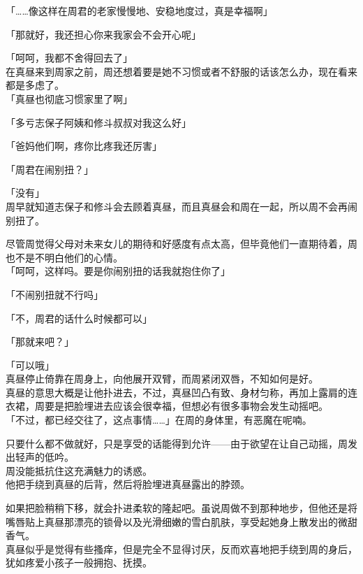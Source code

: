 「……像这样在周君的老家慢慢地、安稳地度过，真是幸福啊」

「那就好，我还担心你来我家会不会开心呢」

「呵呵，我都不舍得回去了」\\

在真昼来到周家之前，周还想着要是她不习惯或者不舒服的话该怎么办，现在看来都是多虑了。\\

「真昼也彻底习惯家里了啊」

「多亏志保子阿姨和修斗叔叔对我这么好」

「爸妈他们啊，疼你比疼我还厉害」

「周君在闹别扭？」

「没有」\\

周早就知道志保子和修斗会去顾着真昼，而且真昼会和周在一起，所以周不会再闹别扭了。

尽管周觉得父母对未来女儿的期待和好感度有点太高，但毕竟他们一直期待着，周也不是不明白他们的心情。\\

「呵呵，这样吗。要是你闹别扭的话我就抱住你了」

「不闹别扭就不行吗」

「不，周君的话什么时候都可以」

「那就来吧？」

「可以哦」\\

真昼停止倚靠在周身上，向他展开双臂，而周紧闭双唇，不知如何是好。\\

真昼的意思大概是让他扑进去，不过，真昼凹凸有致、身材匀称，再加上露肩的连衣裙，周要是把脸埋进去应该会很幸福，但想必有很多事物会发生动摇吧。\\

「不过，都已经交往了，这点事情……」在周的身体里，有恶魔在呢喃。

只要什么都不做就好，只是享受的话能得到允许——由于欲望在让自己动摇，周发出轻声的低吟。\\

周没能抵抗住这充满魅力的诱惑。\\

他把手绕到真昼的后背，然后将脸埋进真昼露出的脖颈。

如果把脸稍稍下移，就会扑进柔软的隆起吧。虽说周做不到那种地步，但他还是将嘴唇贴上真昼那漂亮的锁骨以及光滑细嫩的雪白肌肤，享受起她身上散发出的微甜香气。\\

真昼似乎是觉得有些搔痒，但是完全不显得讨厌，反而欢喜地把手绕到周的身后，犹如疼爱小孩子一般拥抱、抚摸。\\

